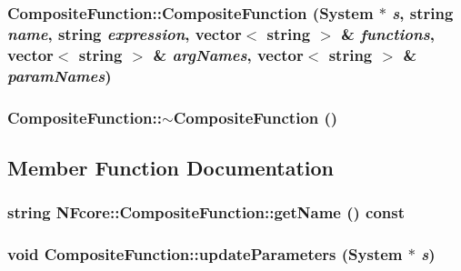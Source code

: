 \subsubsection{\setlength{\rightskip}{0pt plus 5cm}CompositeFunction::CompositeFunction ({\bf System} $\ast$ {\em s}, string {\em name}, string {\em expression}, vector$<$ string $>$ \& {\em functions}, vector$<$ string $>$ \& {\em argNames}, vector$<$ string $>$ \& {\em paramNames})}\label{classNFcore_1_1CompositeFunction_079c7d106715fb7173ff8af596120eeb}


\subsubsection{\setlength{\rightskip}{0pt plus 5cm}CompositeFunction::$\sim$CompositeFunction ()}\label{classNFcore_1_1CompositeFunction_bab4b35111878b8b7ddd17a46571e614}




\subsection{Member Function Documentation}
\subsubsection{\setlength{\rightskip}{0pt plus 5cm}string NFcore::CompositeFunction::getName () const\hspace{0.3cm}{\tt  [inline]}}\label{classNFcore_1_1CompositeFunction_7da7067eef107591b79093a216f5507e}


\subsubsection{\setlength{\rightskip}{0pt plus 5cm}void CompositeFunction::updateParameters ({\bf System} $\ast$ {\em s})}\label{classNFcore_1_1CompositeFunction_860e0f25047cf775954b38fac17539ac}


